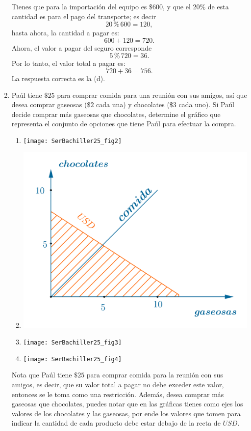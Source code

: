 \documentclass[11pt, a4paper]{article} %
\theoremstyle{dotlessP}
\theoremstyle{dotlessS}
\begin{document}
\begin{enumerate}[label=\color{dg}\theenumi.]
Tienes que para la importación del equipo es \(\$ 600\), y que el \(20 \%\) de esta cantidad es para el pago del transporte; es decir
\[
	20 \,\% \,600= 120,
\]
hasta ahora, la cantidad a pagar es:
\[
	600 + 120 = 720.
\]
Ahora, el valor a pagar del seguro corresponde
\[
	5 \, \% \, 720= 36.
\]
Por lo tanto, el valor total a pagar es:
\[
	720 + 36 = 756.
\]
{\color{dh} La respuesta correcta es la (d).}

\item {\color{db}Paúl tiene \( \$25 \) para comprar comida para una reunión con sus amigos, así que desea comprar gaseosas (\( \$2 \) cada una) y chocolates (\( \$3 \) cada uno). Si Paúl decide comprar más gaseosas que chocolates, determine el gráfico que representa el conjunto de opciones que tiene Paúl para efectuar la compra. 
}
\begin{enumerate}
\item 
\texttt{[image: SerBachiller25\_fig2]}
\item 
\includegraphics[scale=0.4]{SerBachiller25_fig1}
\item 
\texttt{[image: SerBachiller25\_fig3]}
\item 
\texttt{[image: SerBachiller25\_fig4]}
\end{enumerate}
  
  Nota que Paúl tiene \( \$25 \) para comprar comida para la reunión con sus amigos, es decir, que su valor total a pagar no debe exceder este valor, entonces se le toma como una restricción. Además, desea comprar más gaseosas que chocolates, puedes notar que en las gráficas tienes como ejes los valores de los chocolates y las gaseosas,  por ende los valores que tomen para indicar la cantidad de cada producto debe estar debajo de la recta de \(USD\).
  

\end{enumerate}
\end{document}
